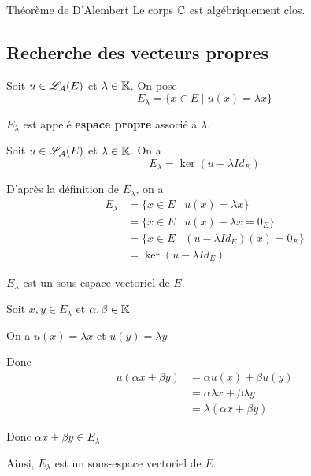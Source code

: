 \documentclass[a4paper, 12pt]{article}
\begin{document}
\begin{theoreme}{Théorème de D'Alembert}{}
    Le corps $\mathbb{C}$ est algébriquement clos.
\end{theoreme}

\subsection{Recherche des vecteurs propres}

\begin{definition}
    Soit $u \in \mathscr{L}_\mathcal{A}(E)$ et $\lambda \in \mathbb{K}$. On pose
    $$
    E_\lambda = \{x \in E \mid u(x) = \lambda x\}
    $$

    $E_\lambda$ est appelé \textbf{espace propre} associé à $\lambda$.\n
\end{definition}

\begin{proposition}{}{}
    Soit $u \in \mathscr{L}_\mathcal{A}(E)$ et $\lambda \in \mathbb{K}$. On a
    $$
    E_\lambda = \ker(u - \lambda Id_E)
    $$
\end{proposition}

\begin{demonstration}
    D'après la définition de $E_\lambda$, on a
    \begin{align*}
        E_\lambda & = \{x \in E \mid u(x) = \lambda x\} \\
                  & = \{x \in E \mid u(x) - \lambda x = 0_E\} \\
                  & = \{x \in E \mid (u - \lambda Id_E)(x) = 0_E\} \\
                  & = \ker(u - \lambda Id_E)
    \end{align*}
\end{demonstration}

\begin{proposition}{}{}
    $E_\lambda$ est un sous-espace vectoriel de $E$.
\end{proposition}

\begin{demonstration}
    Soit $x, y \in E_\lambda$ et $\alpha, \beta \in \mathbb{K}$

    On a $u(x) = \lambda x$ et $u(y) = \lambda y$

    Donc
    \begin{align*}
        u(\alpha x + \beta y) & = \alpha u(x) + \beta u(y) \\
                              & = \alpha \lambda x + \beta \lambda y \\
                              & = \lambda (\alpha x + \beta y)
    \end{align*}

    Donc $\alpha x + \beta y \in E_\lambda$

    Ainsi, $E_\lambda$ est un sous-espace vectoriel de $E$.
\end{demonstration}
\end{document}
